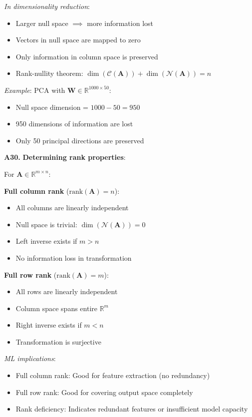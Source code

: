 \documentclass[12pt,a4paper]{article}
\theoremstyle{definition}
\begin{document}
\textit{In dimensionality reduction}:
\begin{itemize}
\item Larger null space $\implies$ more information lost
\item Vectors in null space are mapped to zero
\item Only information in column space is preserved
\item Rank-nullity theorem: $\dim(\mathcal{C}(\mathbf{A})) + \dim(\mathcal{N}(\mathbf{A})) = n$
\end{itemize}

\textit{Example}: PCA with $\mathbf{W} \in \mathbb{R}^{1000 \times 50}$:
\begin{itemize}
\item Null space dimension = $1000 - 50 = 950$
\item 950 dimensions of information are lost
\item Only 50 principal directions are preserved
\end{itemize}

\textbf{A30.} \textbf{Determining rank properties}:

For $\mathbf{A} \in \mathbb{R}^{m \times n}$:

\textbf{Full column rank} ($\text{rank}(\mathbf{A}) = n$):
\begin{itemize}
\item All columns are linearly independent
\item Null space is trivial: $\dim(\mathcal{N}(\mathbf{A})) = 0$
\item Left inverse exists if $m > n$
\item No information loss in transformation
\end{itemize}

\textbf{Full row rank} ($\text{rank}(\mathbf{A}) = m$):
\begin{itemize}
\item All rows are linearly independent
\item Column space spans entire $\mathbb{R}^m$
\item Right inverse exists if $m < n$
\item Transformation is surjective
\end{itemize}

\textit{ML implications}:
\begin{itemize}
\item Full column rank: Good for feature extraction (no redundancy)
\item Full row rank: Good for covering output space completely
\item Rank deficiency: Indicates redundant features or insufficient model capacity
\end{itemize}
\end{document}
